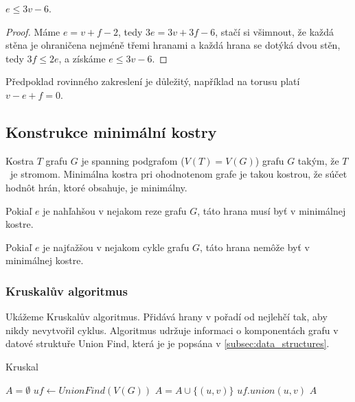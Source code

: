 \begin{corollary}
$e \leq 3v - 6$.
\end{corollary}

\begin{proof}
Máme $e = v + f - 2$, tedy $3e = 3v + 3f -
6$, stačí si všimnout, že každá stěna je ohraničena nejméně třemi
hranami a každá hrana se dotýká dvou stěn, tedy $3f \leq 2e$,
a získáme $e \leq 3v - 6$.
\end{proof}

\begin{note}
    Předpoklad rovinného zakreslení je důležitý,
    například na torusu platí $v - e + f = 0$.
\end{note}

\subsection{Konstrukce minimální kostry}

Kostra $T$ grafu $G$ je spanning podgrafom ($V(T)=V(G)$) grafu $G$ takým,
že $T$~je stromom. Minimálna kostra pri ohodnotenom grafe je takou kostrou,
že súčet hodnôt hrán, ktoré obsahuje, je minimálny.

\begin{theorem}
	Pokiaľ $e$ je nahľahšou v nejakom reze grafu $G$, táto hrana musí
	byť v minimálnej kostre.
\end{theorem}

\begin{theorem}
	Pokiaľ $e$ je najťažšou v nejakom cykle grafu $G$, táto hrana nemôže
	byť v minimálnej kostre.
\end{theorem}

\subsubsection{Kruskalův algoritmus}

Ukážeme Kruskalův algoritmus. Přidává hrany v pořadí od nejlehčí tak,
aby nikdy nevytvořil cyklus.
Algoritmus udržuje informaci o komponentách grafu v datové struktuře
Union Find, která je je popsána v
\autoref{subsec:data_structures}.

\begin{algorithm}
\caption{Kruskal}
\begin{algorithmic}[1]
    \State $A = \emptyset$
    \State $uf \gets UnionFind(V(G))$
            \State $A = A \cup \{(u,v)\}$
            \State $uf.union(u, v)$
        \EndIf
    \EndFor
    \State \Return $A$
\EndFunction
\end{algorithmic}
\end{algorithm}

